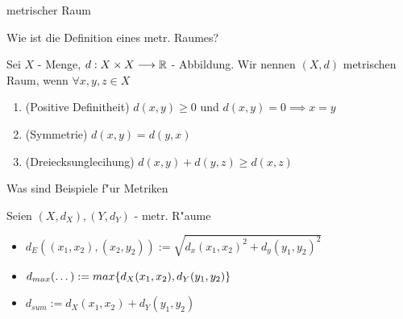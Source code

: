 \documentclass[class=article, crop=false]{standalone}
\begin{document}
\begin{zettel}{metrischer Raum}
\begin{flashcard}
\begin{question}
    Wie ist die Definition eines metr. Raumes?
\end{question}
\begin{definition}
    Sei $X$ - Menge, $d:X \times X \longrightarrow \mathbb{R}$ - Abbildung. Wir nennen $(X,d)$ metrischen Raum, wenn $\forall x,y,z \in X$ 
    \begin{enumerate}
        \item (Positive Definitheit) $d(x,y) \geq 0$ und $d(x,y)= 0 \implies x = y$ 
        \item (Symmetrie) $d(x,y) = d(y,x)$ 
        \item (Dreiecksunglecihung) $d(x,y) + d(y,z) \geq d(x,z)$ 
    \end{enumerate}
\end{definition}
\end{flashcard}

\begin{flashcard}
\begin{question}
    Was sind Beispiele f"ur Metriken
\end{question}
    \begin{example}[Metriken]
    Seien $ (X,d_X) , (Y,d_Y)  $ - metr. R"aume
    \begin{itemize}
        \item $d_E ( (x_1,x_2) , (x_2,y_2)) := \sqrt{d_x (x_1,x_2)^2 + d_y (y_1,y_2)^2  }$ 
        \item $d_{max} (\dots) := max \set{ d_X (x_1,x_2) , d_Y  (y_1,y_2) }$
        \item $d_{sum} := d_X (x_1,x_2) +  d_Y (y_1,y_2) $
    \end{itemize}
\end{example}    
\end{flashcard}


\end{zettel}
\end{document}
